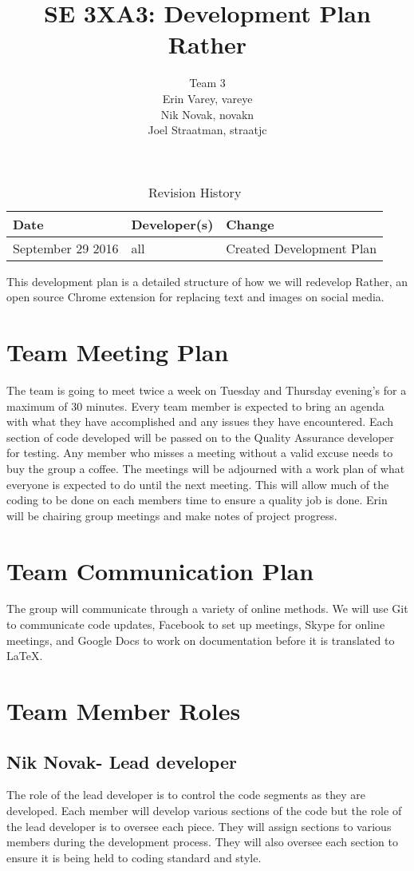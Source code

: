 \documentclass{article}
\title{SE 3XA3: Development Plan\\Rather}
\author{Team 3
		\\ Erin Varey, vareye
		\\ Nik Novak, novakn
		\\ Joel Straatman, straatjc
}
\date{}
\begin{document}
\begin{table}[hp]
\caption{Revision History} \label{TblRevisionHistory}
\begin{tabularx}{\textwidth}{llX}
\toprule
\textbf{Date} & \textbf{Developer(s)} & \textbf{Change}\\
\midrule
September 29 2016 & all & Created Development Plan\\

\bottomrule
\end{tabularx}
\end{table}
\newpage
\maketitle
This development plan is a detailed structure of how we will redevelop Rather, an open source Chrome extension for replacing text and images on social media.
\section{Team Meeting Plan}
The team is going to meet twice a week on Tuesday and Thursday evening's for a maximum of 30 minutes. Every team member is expected to bring an agenda with what they have accomplished and any issues they have encountered. Each section of code developed will be passed on to the Quality Assurance developer for testing. Any member who misses a meeting without a valid excuse needs to buy the group a coffee. The meetings will be adjourned with a work plan of what everyone is expected to do until the next meeting. This will allow much of the coding to be done on each members time to ensure a quality job is done. Erin will be chairing group meetings and make notes of project progress.
\section{Team Communication Plan}
The group will communicate through a variety of online methods. We will use Git to communicate code updates, Facebook to set up meetings, Skype for online meetings, and Google Docs to work on documentation before it is translated to LaTeX.
\section{Team Member Roles}
\subsection{Nik Novak- Lead developer}
The role of the lead developer is to control the code segments as they are developed. Each member will develop various sections of the code but the role of the lead developer is to oversee each piece. They will assign sections to various members during the development process. They will also oversee each section to ensure it is being held to coding standard and style. 
\end{document}
